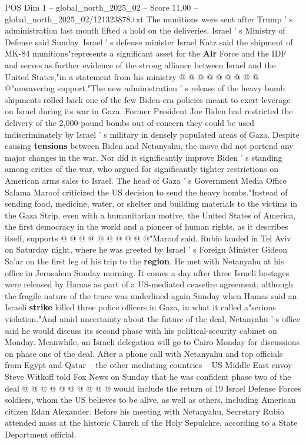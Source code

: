 \begin{textsample}{POS Dim 1 – global\_north\_2025\_02 – Score 11.00 – global\_north\_2025\_02/121323878.txt}
The munitions were sent after Trump ' s administration last month lifted a hold on the deliveries, Israel ' s Ministry of Defense said Sunday.
Israel ' s defense minister Israel Katz said the shipment of MK-84 munitions"represents a significant asset for the \textbf{Air} Force and the IDF and serves as further evidence of the strong alliance between Israel and the United States,"in a statement from his ministry @ @ @ @ @ @ @ @ @ @"unwavering support."The new administration ' s release of the heavy bomb shipments rolled back one of the few Biden-era policies meant to exert leverage on Israel during its war in Gaza.
Former President Joe Biden had restricted the delivery of the 2,000-pound bombs out of concern they could be used indiscriminately by Israel ' s military in densely populated areas of Gaza.
Despite causing \textbf{tensions} between Biden and Netanyahu, the move did not portend any major changes in the war.
Nor did it significantly improve Biden ' s standing among critics of the war, who argued for significantly tighter restrictions on American arms sales to Israel.
The head of Gaza ' s Government Media Office Salama Maroof criticized the US decision to send the heavy bombs."Instead of sending food, medicine, water, or shelter and building materials to the victims in the Gaza Strip, even with a humanitarian motive, the United States of America, the first democracy in the world and a pioneer of human rights, as it describes itself, supports @ @ @ @ @ @ @ @ @ @"Maroof said.
Rubio landed in Tel Aviv on Saturday night, where he was greeted by Israel ' s Foreign Minister Gideon Sa'ar on the first leg of his trip to the \textbf{region}.
He met with Netanyahu at his office in Jerusalem Sunday morning.
It comes a day after three Israeli hostages were released by Hamas as part of a US-mediated ceasefire agreement, although the fragile nature of the truce was underlined again Sunday when Hamas said an Israeli \textbf{strike} killed three police officers in Gaza, in what it called a"serious violation."And amid uncertainty about the future of the deal, Netanyahu ' s office said he would discuss its second phase with his political-security cabinet on Monday.
Meanwhile, an Israeli delegation will go to Cairo Monday for discussions on phase one of the deal.
After a phone call with Netanyahu and top officials from Egypt and Qatar -- the other mediating countries -- US Middle East envoy Steve Witkoff told Fox News on Sunday that he was confident phase two of the deal @ @ @ @ @ @ @ @ @ @ would include the return of 19 Israel Defense Forces soldiers, whom the US believes to be alive, as well as others, including American citizen Edan Alexander.
Before his meeting with Netanyahu, Secretary Rubio attended mass at the historic Church of the Holy Sepulchre, according to a State Department official.

\end{textsample}
